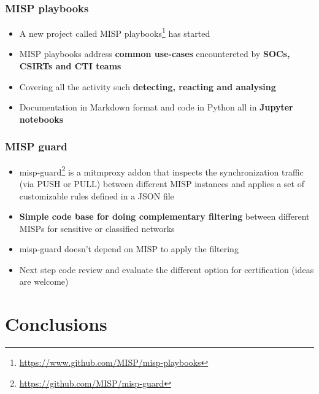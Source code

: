 \begin{frame}
  \frametitle{MISP playbooks}
  \begin{itemize}
    \item A new project called MISP playbooks\footnote{\url{https://www.github.com/MISP/misp-playbooks}} has started
    \item MISP playbooks address {\bf common use-cases} encountereted by {\bf SOCs, CSIRTs and CTI teams}
    \item Covering all the activity such {\bf detecting, reacting and analysing}
    \item Documentation in Markdown format and code in Python all in {\bf Jupyter notebooks}
  \end{itemize}
\end{frame}

\begin{frame}
    \frametitle{MISP guard}
    \begin{itemize}
        \item misp-guard\footnote{\url{https://github.com/MISP/misp-guard}} is a mitmproxy addon that inspects the synchronization traffic (via PUSH or PULL) between different MISP instances and applies a set of customizable rules defined in a JSON file
        \item {\bf Simple code base for doing complementary filtering} between different MISPs for sensitive or classified networks
        \item misp-guard doesn't depend on MISP to apply the filtering
        \item Next step code review and evaluate the different option for certification (ideas are welcome)
    \end{itemize}
\end{frame}

\section{Conclusions}

